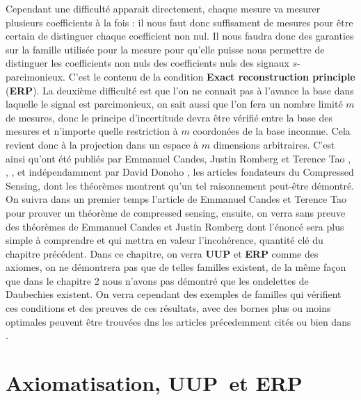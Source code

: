 Cependant une difficulté apparait directement, chaque mesure va mesurer plusieurs coefficients à la fois : il  nous faut donc suffisament de mesures pour être certain de distinguer chaque coefficient non nul.
Il nous faudra donc des garanties sur la famille utilisée pour la mesure pour qu'elle puisse nous permettre de distinguer les coefficients non nuls des coefficients nuls des signaux $s$-parcimonieux.
C'est le contenu de la condition \textbf{Exact reconstruction principle} (\textbf{ERP}).
\newline
La deuxième difficulté est que l'on ne connait pas à l'avance la base dans laquelle le signal est parcimonieux, on sait aussi que l'on fera un nombre limité $m$ de mesures, donc le principe d'incertitude devra être vérifié entre la base des mesures et n'importe quelle restriction à $m$ coordonées de la base inconnue.
Cela revient donc à la projection dans un espace à $m$ dimensions arbitraires.
C'est ainsi qu'ont été publiés par Emmanuel Candes, Justin Romberg et Terence Tao \cite{CR}, \cite{CT}, \cite{CRT}, et indépendamment par David Donoho \cite{DonohoCS}, les articles fondateurs du Compressed Sensing, dont les théorèmes montrent qu'un tel raisonnement peut-être démontré. 
\newline
On suivra dans un premier temps l'article de Emmanuel Candes et Terence Tao pour prouver un théorème de compressed sensing, ensuite, on verra sans preuve des théorèmes de Emmanuel Candes et Justin Romberg dont l'énoncé sera plus simple à comprendre et qui mettra en valeur l'incohérence, quantité clé du chapitre précédent.
Dans ce chapitre, on verra \textbf{UUP} et \textbf{ERP} comme des axiomes, on ne démontrera pas que de telles familles existent, de la même façon que dans le chapitre 2 nous n'avons pas démontré que les ondelettes de Daubechies existent.
On verra cependant des exemples de familles qui vérifient ces conditions et des preuves de ces résultats, avec des bornes plus ou moins optimales peuvent être trouvées dns les articles précedemment cités ou bien dans \cite{foucartbook}. 
\section{Axiomatisation, \textbf{UUP} et \textbf{ERP}}
